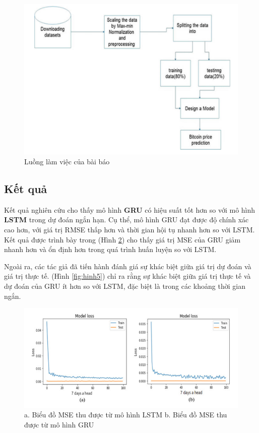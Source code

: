 \begin{figure}[h!]
    \centering
    \includegraphics[width=\textwidth]{images/chapter5/flow.png}
    \caption{Luồng làm việc của bài báo}
    \label{fig:lstm_summary}
\end{figure}

\subsection{Kết quả}
Kết quả nghiên cứu cho thấy mô hình \textbf{GRU} có hiệu suất tốt hơn so với mô hình \textbf{LSTM} trong dự đoán ngắn hạn. Cụ thể, mô hình GRU đạt được độ chính xác cao hơn, với giá trị RMSE thấp hơn và thời gian hội tụ nhanh hơn so với LSTM. Kết quả được trình bày trong (Hình \ref{fig:hinh4}) cho thấy giá trị MSE của GRU giảm nhanh hơn và ổn định hơn trong quá trình huấn luyện so với LSTM.

Ngoài ra, các tác giả đã tiến hành đánh giá sự khác biệt giữa giá trị dự đoán và giá trị thực tế. (Hình \ref{fig:hinh5}) chỉ ra rằng sự khác biệt giữa giá trị thực tế và dự đoán của GRU ít hơn so với LSTM, đặc biệt là trong các khoảng thời gian ngắn.

\begin{figure}[h!]
    \centering
    \includegraphics[width=\textwidth]{images/chapter5/hinh4.png}
    \caption{a. Biểu đồ MSE thu được từ mô hình LSTM b. Biểu đồ MSE thu được từ mô hình GRU}
    \label{fig:hinh4}
\end{figure}

